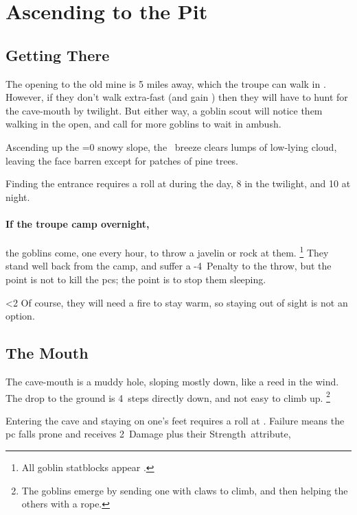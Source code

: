 \section{Ascending to the Pit}

\begin{multicols}{2}

\subsection{Getting There}

The opening to the old mine is 5 miles away, which the troupe can walk in .
However, if they don't walk extra-fast (and gain ) then they will have to hunt for the cave-mouth by twilight.
But either way, a goblin scout will notice them walking in the open, and call for more goblins to wait in ambush.

\begin{boxtext}
  Ascending up the \ifnum\value{temperature}=0 snowy \fi slope, the \showTemperature\ breeze clears lumps of low-lying cloud, leaving the face barren except for patches of pine trees.
\end{boxtext}

Finding the entrance requires a  roll at \tn[6] during the day, 8 in the twilight, and 10 at night.

\paragraph{If the troupe camp overnight,}
the goblins come, one every hour, to throw a javelin or rock at them.%
\footnote{All goblin statblocks appear .}
They stand well back from the camp, and suffer a -4~Penalty to the throw, but the point is not to kill the \glspl{pc}; the point is to stop them sleeping.

\ifnum\value{temperature}<2%
  Of course, they will need a fire to stay warm, so staying out of sight is not an option.
\fi

\playCommentaryCaveIn

\subsection{The Mouth}

The cave-mouth is a muddy hole, sloping mostly down, like a reed in the wind.
The drop to the ground is 4~\glspl{step} directly down, and not easy to climb up.%
\footnote{The goblins emerge by sending one with claws to climb, and then helping the others with a rope.}

Entering the cave and staying on one's feet requires a  roll at \tn[6].
Failure means the \gls{pc} falls prone%
and receives 2~Damage plus their Strength~\gls{attribute},

\end{multicols}

